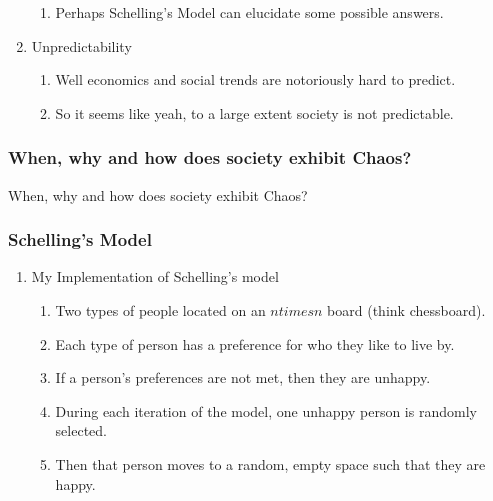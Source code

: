 \documentclass[11pt, handout]{beamer}
\begin{document}
\begin{frame}
\begin{enumerate}
\begin{enumerate}
                \item Perhaps Schelling's Model can elucidate some possible answers.
            \end{enumerate}
        \item Unpredictability
            \begin{enumerate}
                \item Well economics and social trends are notoriously hard to predict. 
                \item So it seems like yeah, to a large extent society is not predictable.
            \end{enumerate}
    \end{enumerate}
\end{frame}

\begin{frame}
    \frametitle{When, why and how does society exhibit Chaos?}
    When, why and how does society exhibit Chaos?
\end{frame}

\begin{frame}
    \frametitle{Schelling's Model}
    \begin{enumerate}
        \item My Implementation of Schelling's model
            \begin{enumerate}
                \item Two types of people located on an $n times n$ board (think chessboard).
                \item Each type of person has a preference for who they like to live by.
                \item If a person's preferences are not met, then they are unhappy.
                \item During each iteration of the model, one unhappy person is randomly selected.
                \item Then that person moves to a random, empty space such that they are happy.
            \end{enumerate}
    \end{enumerate}
\end{frame}
\end{document}
